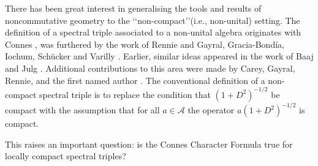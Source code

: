     
    There has been great interest in generalising the tools and results of noncommutative geometry to the \lq\lq non-compact\rq\rq (i.e., non-unital) setting. {  The definition
    of a spectral triple associated to a non-unital algebra originates with Connes \cite{Connes-reality}, was furthered by the work of Rennie \cite{Rennie-2003, Rennie-2004}
    and Gayral, Gracia-Bond\'ia, Iochum, Sch\"ucker and Varilly \cite{gayral-moyal}. Earlier, similar ideas appeared in the work of Baaj and Julg \cite{Baaj-Julg}. Additional contributions to this area were made by Carey,
    Gayral, Rennie, and the first named author \cite{CGRS1,CGRS2}. The conventional definition 
    of a non-compact spectral triple is to replace the condition that $(1+D^2)^{-1/2}$ be compact with the assumption that for all $a \in \mathcal{A}$ the operator $a(1+D^2)^{-1/2}$ is compact.     
    }
    
    This raises an important question: is the Connes Character Formula true for locally compact spectral triples? 
    
